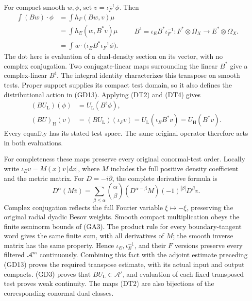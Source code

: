 \documentclass[
  11pt,
]{article}
\begin{document}
For compact smooth \(w,\phi\), set \(v=\iota_F^{-1}\phi\). Then \[
 \begin{aligned}
 \int (Bw)\mathbin{\cdot}\phi
 &=\int h_F(Bw,v)\mu\\
 &=\int h_E(w,B^*v)\mu\\
 &=\int w\mathbin{\cdot}
               \bigl(\iota_E B^*\iota_F^{-1}\phi\bigr).
 \end{aligned}
 \qquad
 B^{\mathrm t}=\iota_E B^*\iota_F^{-1}:
 F^*\otimes\Omega_X\longrightarrow E^*\otimes\Omega_X .
 \tag{DT4}
\] The dot here is evaluation of a dual-density section on its vector,
with no complex conjugation. Two conjugate-linear maps surrounding the
linear \(B^*\) give a complex-linear \(B^{\mathrm t}\). The integral
identity characterizes this transpose on smooth tests. Proper support
supplies its compact test domain, so it also defines the distributional
action in (GD13). Applying (DT2) and (DT4) gives \[
 \begin{aligned}
 (B U_{\mathrm L})(\phi)&=U_{\mathrm L}(B^{\mathrm t}\phi),\\
 (B U)_{\mathrm H}(v)
   &=(B U_{\mathrm L})(\iota_Fv)
     =U_{\mathrm L}(\iota_E B^*v)
     =U_{\mathrm H}(B^*v).
 \end{aligned}
 \tag{DT5}
\] Every equality has its stated test space. The same original operator
therefore acts in both evaluations.

For completeness these maps preserve every original conormal-test order.
Locally write \(\iota_Ev=M(x)\overline v\,|dx|\), where \(M\) includes
the full positive density coefficient and the metric matrix. For
\(D=-i\partial\), the complete derivative formula is \[
 D^\alpha(M\overline v)
 =\sum_{\beta\le\alpha}\binom{\alpha}{\beta}
       (D^{\alpha-\beta}M)(-1)^{|\beta|}
                       \overline{D^\beta v}.
 \tag{DT6}
\] Complex conjugation reflects the full Fourier variable
\(\xi\mapsto-\xi\), preserving the original radial dyadic Besov weights.
Smooth compact multiplication obeys the finite seminorm bounds of (GA3).
The product rule for every boundary-tangent word gives the same finite
sum, with all derivatives of \(M\); the smooth inverse matrix has the
same property. Hence \(\iota_E,\iota_E^{-1}\), and their \(F\) versions
preserve every filtered \(\mathcal A^m\) continuously. Combining this
fact with the adjoint estimate preceding (GD13) proves the required
transpose estimate, with its actual input and output compacts. (GD3)
proves that \(B U_{\mathrm L}\in\mathcal A'\), and evaluation of each
fixed transposed test proves weak continuity. The maps (DT2) are also
bijections of the corresponding conormal dual classes.
\end{document}
